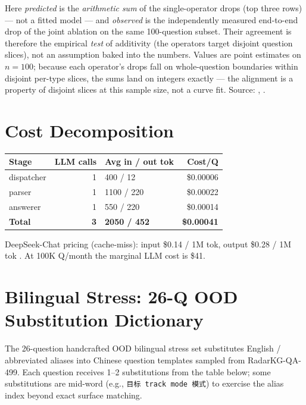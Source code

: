 \documentclass[11pt,a4paper]{article}
\begin{document}
Here \emph{predicted} is the \emph{arithmetic sum} of the single-operator drops (top three rows) --- not a fitted model --- and \emph{observed} is the independently measured end-to-end drop of the joint ablation on the same 100-question subset. Their agreement is therefore the empirical \emph{test} of additivity (the operators target disjoint question slices), not an assumption baked into the numbers. Values are point estimates on $n{=}100$; because each operator's drops fall on whole-question boundaries within disjoint per-type slices, the sums land on integers exactly --- the alignment is a property of disjoint slices at this sample size, not a curve fit. Source: , .

\section{Cost Decomposition}
\label{app:cost}

\begin{table}[h]
\centering
\small
\begin{tabular}{l r l r}
\toprule
\textbf{Stage} & \textbf{LLM calls} & \textbf{Avg in / out tok} & \textbf{Cost/Q} \\
\midrule
dispatcher & 1 & 400 / 12   & \$0.00006 \\
parser     & 1 & 1100 / 220 & \$0.00022 \\
answerer   & 1 & 550 / 220  & \$0.00014 \\
\midrule
\textbf{Total} & \textbf{3} & \textbf{2050 / 452} & \textbf{\$0.00041} \\
\bottomrule
\end{tabular}
\end{table}

DeepSeek-Chat pricing (cache-miss): input \$0.14 / 1M tok, output \$0.28 / 1M tok \citep{deepseek_api}. At 100K Q/month the marginal LLM cost is \$41.

\section{Bilingual Stress: 26-Q OOD Substitution Dictionary}
\label{app:bilingual}

The 26-question handcrafted OOD bilingual stress set substitutes English / abbreviated aliases into Chinese question templates sampled from RadarKG-QA-499. Each question receives 1--2 substitutions from the table below; some substitutions are mid-word (e.g., \texttt{目标 track mode 模式}) to exercise the alias index beyond exact surface matching.
\end{document}
